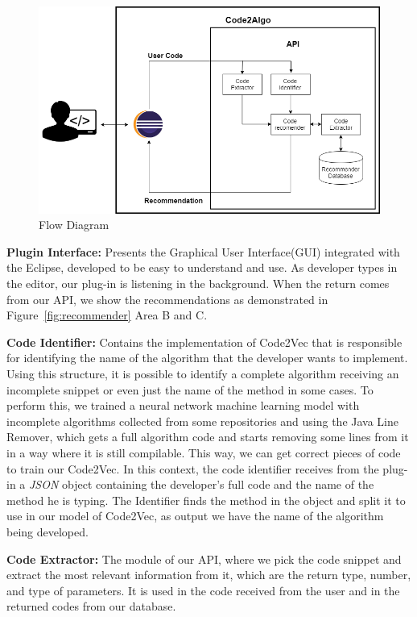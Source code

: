 \documentclass[12pt]{article}
\begin{document}
    \begin{figure}[h]
        \centering
        \includegraphics[width=\linewidth]{cbsoft19/figs/Figure2.png}
        \caption{Flow Diagram}
        \label{fig:api}
    \end{figure}

    \textbf{Plugin Interface:} Presents the Graphical User Interface(GUI) integrated with the Eclipse, developed to be easy to understand and use. As developer types in the editor, our plug-in is listening in the background. When the return comes from our API, we show the recommendations as demonstrated in Figure~\ref{fig:recommender} Area B and C.
    
    \textbf{Code Identifier:} Contains the implementation of Code2Vec \cite{Alon2018Code2vec} that is responsible for identifying the name of the algorithm that the developer wants to implement.  Using this structure, it is possible to identify a complete algorithm receiving an incomplete snippet or even just the name of the method in some cases. To perform this, we trained a neural network machine learning model with incomplete algorithms collected from some repositories and using the Java Line Remover, which gets a full algorithm code and starts removing some lines from it in a way where it is still compilable. This way, we can get correct pieces of code to train our Code2Vec. In this context, the code identifier receives from the plug-in a \textit{JSON} object containing the developer's full code and the name of the method he is typing. The Identifier finds the method in the object and split it to use in our model of Code2Vec, as output we have the name of the algorithm being developed. 
        
    \textbf{Code Extractor:} The module of our API, where we pick the code snippet and extract the most relevant information from it, which are the return type, number, and type of parameters. It is used in the code received from the user and in the returned codes from our database. 
    
\end{document}
